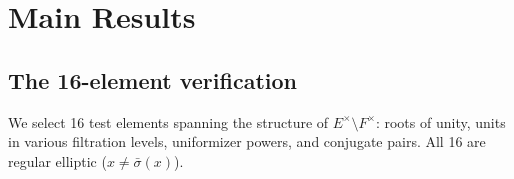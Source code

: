 \documentclass[11pt]{article}
\theoremstyle{plain}
\theoremstyle{definition}
\theoremstyle{remark}
\begin{document}
\section{Main Results}\label{sec:main}

\subsection{The 16-element verification}

We select 16 test elements spanning the structure of
$E^\times \setminus F^\times$: roots of unity, units
in various filtration levels, uniformizer powers, and
conjugate pairs.  All 16 are regular elliptic
($x \neq \bar\sigma(x)$).
\end{document}
